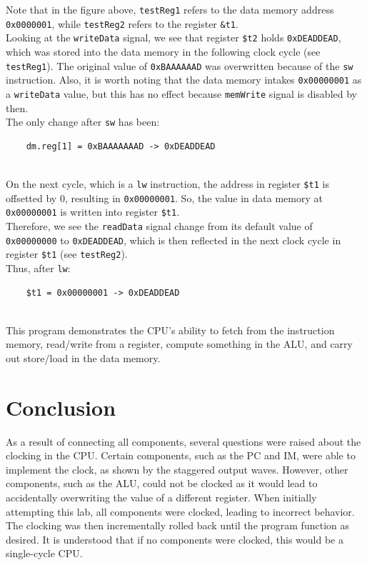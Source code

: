 \documentclass[twocolumn]{article}
\newcommand{\cc}[1]{\texttt{#1}}
\begin{document}
Note that in the figure above, \cc{testReg1} refers to the data memory address \cc{0x0000001}, while \cc{testReg2} refers to the register \cc{\&t1}. \\

Looking at the \cc{writeData} signal, we see that register \cc{\$t2} holds \cc{0xDEADDEAD}, which was stored into the data memory in the following clock cycle (see \cc{testReg1}). The original value of \cc{0xBAAAAAAD} was overwritten because of the \cc{sw} instruction. Also, it is worth noting that the data memory intakes \cc{0x00000001} as a \cc{writeData} value, but this has no effect because \cc{memWrite} signal is disabled by then. \\

The only change after \cc{sw} has been: 
\begin{lstlisting}
    dm.reg[1] = 0xBAAAAAAAD -> 0xDEADDEAD
\end{lstlisting}
\\

On the next cycle, which is a \cc{lw} instruction, the address in register \cc{\$t1} is offsetted by 0, resulting in  \cc{0x00000001}. So, the value in data memory at \cc{0x00000001} is written into register \cc{\$t1}. \\

Therefore, we see the \cc{readData} signal change from its default value of \cc{0x00000000} to \cc{0xDEADDEAD}, which is then reflected in the next clock cycle in register \cc{\$t1} (see \cc{testReg2}).\\

Thus, after \cc{lw}: 
\begin{lstlisting}
    $t1 = 0x00000001 -> 0xDEADDEAD
\end{lstlisting}
\\

This program demonstrates the CPU's ability to fetch from the instruction memory, read/write from a register, compute something in the ALU, and carry out store/load in the data memory. 


\section{Conclusion}

As a result of connecting all components, several questions were raised about the clocking in the CPU. Certain components, such as the PC and IM, were able to implement the clock, as shown by the staggered output waves. However, other components, such as the ALU, could not be clocked as it would lead to accidentally overwriting the value of a different register. When initially attempting this lab, all components were clocked, leading to incorrect behavior. The clocking was then incrementally rolled back until the program function as desired. It is understood that if no components were clocked, this would be a single-cycle CPU.\\
\end{document}
